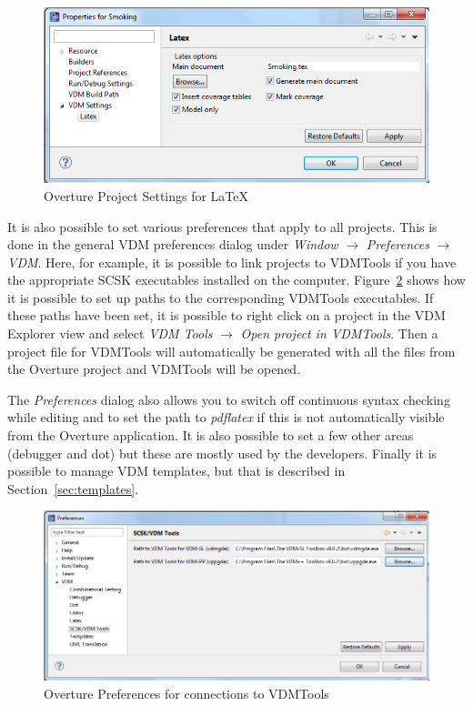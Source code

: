 \documentclass{overturerepchap}
\begin{document}
\begin{figure}[!hbt]
\begin{center}
  \includegraphics[width=\textwidth]{screenDumps/projectsettingslatex}
  \caption[Overture Project Settings]{Overture Project Settings for \LaTeX}
  \label{fig:VDMSettingsLatex}
\end{center}
\end{figure}

It is also possible to set various preferences that apply to
all projects. This is done in the general VDM preferences dialog under
\emph{Window} $\rightarrow$ \emph{Preferences} $\rightarrow$
\emph{VDM}. Here, for example, it is possible to link projects to
VDMTools if you have the appropriate SCSK executables installed on
the computer. Figure~\ref{fig:SCSKPreferences} shows how it is possible to
set up paths to the corresponding VDMTools executables. If these paths have
been set, it is possible to right click on a project in the VDM
Explorer view and select \emph{VDM Tools} $\rightarrow$
\emph{Open project in VDMTools}. Then a project file for VDMTools
will automatically be generated with all the files from the Overture project
and VDMTools will be opened. 

The \emph{Preferences} dialog also
allows you to switch off continuous syntax checking while editing and
to set the path to \emph{pdflatex} if this is not automatically
visible from the Overture application. It is also possible to set a few
other areas (debugger and dot) but these are mostly used by the developers.
Finally it is possible to
manage VDM templates, but that is described in Section~\ref{sec:templates}.

\begin{figure}[!hbt]
\begin{center}
  \includegraphics[width=\textwidth]{screenDumps/CSKPreferences}
  \caption{Overture Preferences for connections to VDMTools}
  \label{fig:SCSKPreferences}
\end{center}
\end{figure}
\end{document}
